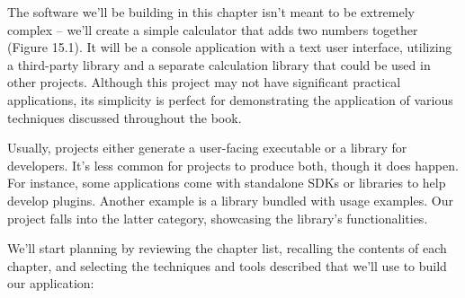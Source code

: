 The software we’ll be building in this chapter isn’t meant to be extremely complex – we’ll create a simple calculator that adds two numbers together (Figure 15.1). It will be a console application with a text user interface, utilizing a third-party library and a separate calculation library that could be used in other projects. Although this project may not have significant practical applications, its simplicity is perfect for demonstrating the application of various techniques discussed throughout the book.


Usually, projects either generate a user-facing executable or a library for developers. It’s less common for projects to produce both, though it does happen. For instance, some applications come with standalone SDKs or libraries to help develop plugins. Another example is a library bundled with usage examples. Our project falls into the latter category, showcasing the library’s functionalities.

We’ll start planning by reviewing the chapter list, recalling the contents of each chapter, and selecting the techniques and tools described that we’ll use to build our application:

